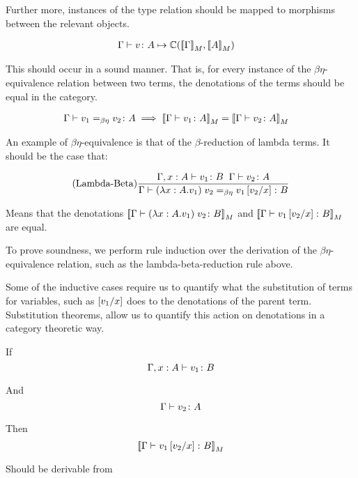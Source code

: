 \documentclass{Report}
\begin{document}
Further more, instances of the type relation should be mapped to morphisms between the relevant objects.

\begin{align}
    \gtyperelation{v}{A} & \mapsto \C(\deno{\G}, \deno{A}) 
\end{align}

This should occur in a sound manner. That is, for every instance of the $\beta\eta$-equivalence relation between two terms, the denotations of the terms should be equal in the category.

\begin{align}
    \gberelation{v_1}{v_2}{A} & \implies \deno{\gtyperelation{v_1}{A}} = \deno{\gtyperelation{v_2}{A}}
\end{align}

An example of $\beta\eta$-equivalence is that of the $\beta$-reduction of lambda terms. It should be the case that:

\begin{align}
    \treerule{Lambda-Beta}{\typerelation{\gax}{v_1}{B}\s\s\gtyperelation{v_2}{A}}{\gberelation{\apply{(\lam{x}{A}{v_1})}{v_2}}{v_1\ssub{x}{v_2}}{B}}
\end{align}

Means that the denotations $\deno{\gtyperelation{\apply{(\lam{x}{A}{v_1})}{v_2}}{B}}$ and $\deno{\gtyperelation{v_1\ssub{x}{v_2}}{B}}$ are equal.

To prove soundness, we perform rule induction over the derivation of the $\beta\eta$-equivalence relation, such as the lambda-beta-reduction rule above. 

Some of the inductive cases require us to quantify what the substitution of terms for variables, such as $\ssub{x}{v_1}$ does to the denotations of the parent term. Substitution theorems, allow us to quantify this action on denotations in a category theoretic way. 

If \begin{equation}
    \typerelation{\gax}{v_1}{B}
\end{equation}

And \begin{equation}
    \typerelation{\G}{v_2}{A}
\end{equation}

Then \begin{equation}
    \deno{\typerelation{\G}{v_1\ssub{x}{v_2}}{B}}
\end{equation}

Should be derivable from
\end{document}
